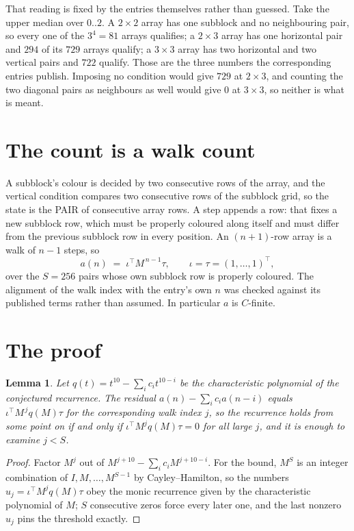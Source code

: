 \documentclass[11pt,a4paper]{article}
\theoremstyle{plain}
\newtheorem{lemma}[theorem]{Lemma}
\theoremstyle{definition}
\begin{document}
That reading is fixed by the entries themselves rather than guessed. Take the upper median
over $0..2$. A $2\times2$ array has one subblock and no neighbouring pair, so every one of the
$3^4=81$ arrays qualifies; a $2\times3$ array has one horizontal pair and $294$ of its $729$
arrays qualify; a $3\times3$ array has two horizontal and two vertical pairs and $722$
qualify. Those are the three numbers the corresponding entries publish. Imposing no condition
would give $729$ at $2\times3$, and counting the two diagonal pairs as neighbours as well
would give $0$ at $3\times3$, so neither is what is meant.

\section{The count is a walk count}

A subblock's colour is decided by two consecutive rows of the array, and
the vertical condition compares two consecutive rows of the subblock grid, so the state is the
PAIR of consecutive array rows. A step appends a row: that fixes a new subblock row, which
must be properly coloured along itself and must differ from the previous subblock row in every
position. An $(n+1)$-row array is a walk of $n-1$ steps, so
\[
a(n)\;=\;\iota^{\!\top}M^{\,n-1}\tau,\qquad\iota=\tau=(1,\dots,1)^{\!\top},
\]
over the $S=256$ pairs whose own subblock row is properly coloured.
The alignment of the walk index with the entry's own $n$ was checked against its published
terms rather than assumed. In particular $a$ is $C$-finite.

\section{The proof}

\begin{lemma}\label{lem:crit}
Let $q(t)=t^{10}-\sum_i c_it^{10-i}$ be the characteristic polynomial of the
conjectured recurrence. The residual $a(n)-\sum_ic_ia(n-i)$ equals
$\iota^{\!\top}M^{\,j}q(M)\tau$ for the corresponding walk index $j$, so the recurrence
holds from some point on if and only if $\iota^{\!\top}M^{j}q(M)\tau=0$ for all large $j$,
and it is enough to examine $j<S$.
\end{lemma}

\begin{proof}
Factor $M^{j}$ out of $M^{j+10}-\sum_ic_iM^{j+10-i}$. For the bound, $M^{S}$
is an integer combination of $I,M,\dots,M^{S-1}$ by Cayley--Hamilton, so the numbers
$u_j=\iota^{\!\top}M^{j}q(M)\tau$ obey the monic recurrence given by the characteristic
polynomial of $M$; $S$ consecutive zeros force every later one, and the last nonzero $u_j$
pins the threshold exactly.
\end{proof}
\end{document}
